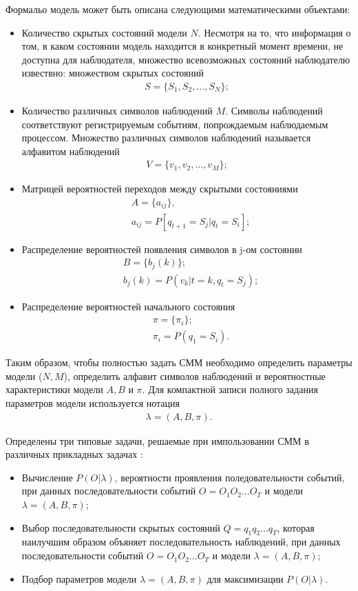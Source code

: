 Формальо модель может быть описана следующими математическими объектами:
\begin{itemize}
	\item
	Количество скрытых состояний модели \(N\). Несмотря на то, что информация о том, в каком состоянии модель находится в конкретный момент времени, не доступна для наблюдателя, множество всевозможных состояний наблюдателю извествно:
	множеством скрытых состояний
	\begin{align} 
		S = \{ S_1, S_2, ..., S_N \};
	\end{align}
	\item
	Количество различных символов наблюдений \(M\). Символы наблюдений соответствуют регистрируемым событиям, попрождаемым наблюдаемым процессом. Множество различных символов наблюдений называется алфавитом наблюдений
	\begin{align} 
		V = \{ v_1, v_2, ..., v_M \};
	\end{align}
	\item
	Матрицей вероятностей переходов между скрытыми состояниями
	\begin{align} 
		&A = \{ a_{ij} \}, \\
		&a_{ij} = P[q_{t + 1} = S_j | q_t = S_i];
	\end{align}
	\item
	Распределение вероятностей появления символов в j-ом состоянии
	\begin{align}
		&B = \{ b_j(k) \}; \\ 
		&b_j(k) = P(v_k | t = k, q_t = S_j);
	\end{align}
	\item
	Распределение вероятностей начального состояния
	\begin{align}
		&\pi = \{\pi_i\}; \\
		&\pi_i = P(q_1 = S_i). 
	\end{align}
\end{itemize}

Таким образом, чтобы полностью задать СММ необходимо определить параметры модели (\(N, M\)), определить алфавит символов наблюдений и вероятностные характеристики модели \(A, B\) и \(\pi\). Для компактной записи полного задания параметров модели используется нотация
\begin{align}
	\lambda = (A, B, \pi).
\end{align}

Определены три типовые задачи, решаемые при импользовании СММ в различных прикладных задачах \cite{Rabiner89atutorial}:
\begin{itemize}
	\item
	Вычисление \(P(O|\lambda)\), вероятности проявления поледовательности событий, при данных последовательности событий \(O=O_1O_2...O_T\) и модели \(\lambda = (A, B, \pi)\);
	\item
	Выбор последовательности скрытых состояний \(Q=q_1q_2...q_T\), которая наилучшим образом объяняет последовательность наблюдений, при данных последовательности событий \(O=O_1O_2...O_T\) и модели \(\lambda = (A, B, \pi)\);
	\item
	Подбор параметров модели \(\lambda = (A, B, \pi)\) для максимизации \(P(O|\lambda)\).
\end{itemize} 


